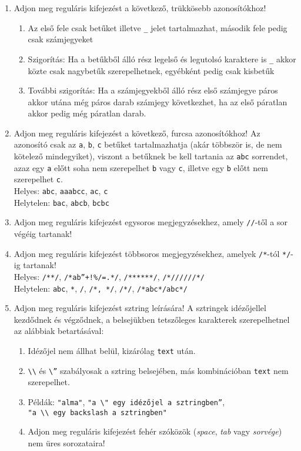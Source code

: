 \begin{enumerate}
\begin{enumerate}
	\end{enumerate}
	\item Adjon meg reguláris kifejezést a következő, trükkösebb azonosítókhoz!
	\begin{enumerate}
		\item Az első fele csak betűket illetve \texttt{\_} jelet tartalmazhat, második fele pedig csak számjegyeket
		\item Szigorítás: Ha a betűkből álló rész legelső és legutolsó karaktere is \texttt{\_} akkor közte csak nagybetűk
		szerepelhetnek, egyébként pedig csak kisbetűk
		\item További szigorítás: Ha a számjegyekből álló rész első számjegye páros akkor utána még páros darab számjegy következhet, ha az első páratlan akkor pedig még páratlan darab.
	\end{enumerate}
	\item Adjon meg reguláris kifejezést a következő, furcsa azonosítókhoz! Az azonosító csak az \texttt{a}, \texttt{b}, \texttt{c} betűket tartalmazhatja (akár többször is, de nem kötelező mindegyiket), viszont a betűknek be kell tartania az \texttt{abc} sorrendet, azaz egy \texttt{a} előtt soha nem szerepelhet \texttt{b} vagy \texttt{c}, illetve egy \texttt{b} előtt nem szerepelhet \texttt{c}. \\
	Helyes: \texttt{abc}, \texttt{aaabcc}, \texttt{ac}, \texttt{c} \\
	Helytelen: \texttt{bac}, \texttt{abcb}, \texttt{bcbc}
	\item Adjon meg reguláris kifejezést egysoros megjegyzésekhez, amely \texttt{//}-től a sor végéig tartanak!
	\item Adjon meg reguláris kifejezést többsoros megjegyzésekhez, amelyek \texttt{/*}-tól \texttt{*/}-ig tartanak! \\
	Helyes: \texttt{/**/}, \verb*|/*ab”+!%/=.*/|, \verb*|/******/|, \verb*|/*//////*/| \\
	Helytelen: \verb*|abc|, \verb*|*|, \verb*|/|, \verb|/*, */|, \verb*|/*/|, \verb*|/*abc*/abc*/|
	\item Adjon meg reguláris kifejezést sztring leírására! A sztringek idézőjellel kezdődnek és végződnek, a belsejükben tetszőleges karakterek szerepelhetnel az alábbiak betartásával:
	\begin{enumerate}
		\item Idézőjel nem állhat belül, kizárólag \verb*|text| után.
		\item \verb*|\\| és \verb*|\”| szabályosak a sztring belsejében, más kombinációban \verb*|text| nem szerepelhet.
		\item Példák: \verb*|"alma"|, \verb|"a \" egy idézőjel a sztringben”|, \\ \verb|"a \\ egy backslash a sztringben"|
		\item Adjon meg reguláris kifejezést fehér szóközök (\textit{space}, \textit{tab} vagy \textit{sorvége}) nem üres sorozataira!
	\end{enumerate}
\end{enumerate}

